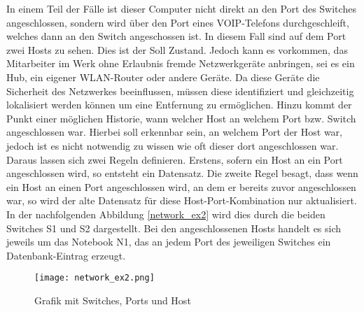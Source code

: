 In einem Teil der Fälle ist dieser Computer nicht direkt an den Port des Switches angeschlossen, sondern wird über den Port eines VOIP-Telefons durchgeschleift, welches dann an den Switch angeschossen ist.
In diesem Fall sind auf dem Port zwei Hosts zu sehen.
Dies ist der Soll Zustand. Jedoch kann es vorkommen, das Mitarbeiter im Werk ohne Erlaubnis fremde Netzwerkgeräte anbringen, sei es ein Hub, ein eigener WLAN-Router oder andere Geräte. Da diese Geräte die Sicherheit des Netzwerkes beeinflussen, müssen diese identifiziert und gleichzeitig lokalisiert werden können um eine Entfernung zu ermöglichen.
Hinzu kommt der Punkt einer möglichen Historie, wann welcher Host an welchem Port bzw. Switch angeschlossen war. Hierbei soll erkennbar sein, an welchem Port der Host war, jedoch ist es nicht notwendig zu wissen wie oft dieser dort angeschlossen war.
Daraus lassen sich zwei Regeln definieren. Erstens, sofern ein Host an ein Port angeschlossen wird, so entsteht ein Datensatz. Die zweite Regel besagt, dass wenn ein Host an einen Port angeschlossen wird, an dem er bereits zuvor angeschlossen war, so wird der alte Datensatz für diese Host-Port-Kombination nur aktualisiert. 
In der nachfolgenden Abbildung \ref{network_ex2} wird dies durch die beiden Switches S1 und S2 dargestellt. Bei den angeschlossenen Hosts handelt es sich jeweils um das Notebook N1, das an jedem Port des jeweiligen Switches ein Datenbank-Eintrag erzeugt.\\

\begin{figure}[H]
\centering
\texttt{[image: network\_ex2.png]}
\caption{Grafik mit Switches, Ports und Host}
\label{fig:network_ex2}
\end{figure}


